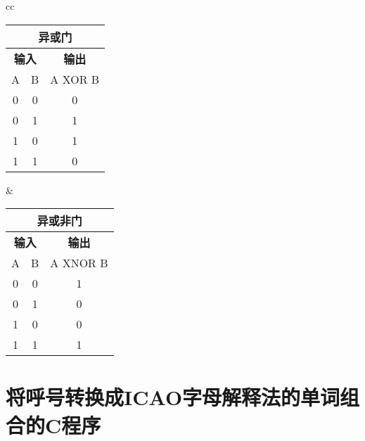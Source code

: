 \begin{tabular}{cc}%
  \begin{tabular}{|c|c|c|}
    \multicolumn{3}{c}{\textbf{异或门}}                          \\
    \hline
    \multicolumn{2}{|c|}{\textbf{输入}} & \textbf{输出}           \\
    \hline
    A                                 & B           & A XOR B \\
    \hline
    \num{0}                           & \num{0}     & \num{0} \\
    \hline
    \num{0}                           & \num{1}     & \num{1} \\
    \hline
    \num{1}                           & \num{0}     & \num{1} \\
    \hline
    \num{1}                           & \num{1}     & \num{0} \\
    \hline
  \end{tabular} &
  \begin{tabular}{|c|c|c|}
    \multicolumn{3}{c}{\textbf{异或非门}}                          \\
    \hline
    \multicolumn{2}{|c|}{\textbf{输入}} & \textbf{输出}            \\
    \hline
    A                                 & B           & A XNOR B \\
    \hline
    \num{0}                           & \num{0}     & \num{1}  \\
    \hline
    \num{0}                           & \num{1}     & \num{0}  \\
    \hline
    \num{1}                           & \num{0}     & \num{0}  \\
    \hline
    \num{1}                           & \num{1}     & \num{1}  \\
    \hline
  \end{tabular} \tabularnewline
\end{tabular}

\newpage

%

\section{将呼号转换成ICAO字母解释法的单词组合的C程序}


